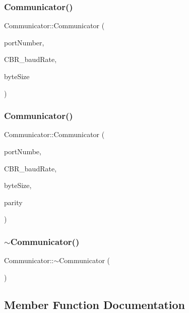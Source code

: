 \subsubsection{Communicator()\hspace{0.1cm}{\footnotesize\ttfamily [2/3]}}
{\footnotesize\ttfamily Communicator\+::\+Communicator (\begin{DoxyParamCaption}\item[{uint8\+\_\+t}]{port\+Number,  }\item[{D\+W\+O\+RD}]{C\+B\+R\+\_\+baud\+Rate,  }\item[{byte}]{byte\+Size }\end{DoxyParamCaption})}

\mbox{\label{class_communicator_a86b21e90bb3c1c8afedcc2c1e523c79c}} 
\subsubsection{Communicator()\hspace{0.1cm}{\footnotesize\ttfamily [3/3]}}
{\footnotesize\ttfamily Communicator\+::\+Communicator (\begin{DoxyParamCaption}\item[{uint8\+\_\+t}]{port\+Numbe,  }\item[{D\+W\+O\+RD}]{C\+B\+R\+\_\+baud\+Rate,  }\item[{byte}]{byte\+Size,  }\item[{byte}]{parity }\end{DoxyParamCaption})}

\mbox{\label{class_communicator_a4ced5362bf7438924f8d7f1b0c5ec391}} 
\subsubsection{$\sim$\+Communicator()}
{\footnotesize\ttfamily Communicator\+::$\sim$\+Communicator (\begin{DoxyParamCaption}{ }\end{DoxyParamCaption})}



\subsection{Member Function Documentation}
\mbox{\label{class_communicator_adfc4f5c9dc389520bcd6d49214564b06}} 
